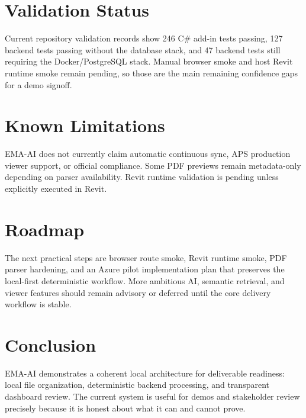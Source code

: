 \documentclass[11pt]{article}
\begin{document}
\section{Validation Status}
Current repository validation records show 246 C\# add-in tests passing, 127 backend tests passing without the database stack, and 47 backend tests still requiring the Docker/PostgreSQL stack. Manual browser smoke and host Revit runtime smoke remain pending, so those are the main remaining confidence gaps for a demo signoff.

\section{Known Limitations}
EMA-AI does not currently claim automatic continuous sync, APS production viewer support, or official compliance. Some PDF previews remain metadata-only depending on parser availability. Revit runtime validation is pending unless explicitly executed in Revit.

\section{Roadmap}
The next practical steps are browser route smoke, Revit runtime smoke, PDF parser hardening, and an Azure pilot implementation plan that preserves the local-first deterministic workflow. More ambitious AI, semantic retrieval, and viewer features should remain advisory or deferred until the core delivery workflow is stable.

\section{Conclusion}
EMA-AI demonstrates a coherent local architecture for deliverable readiness: local file organization, deterministic backend processing, and transparent dashboard review. The current system is useful for demos and stakeholder review precisely because it is honest about what it can and cannot prove.

\nocite{*}


\end{document}
